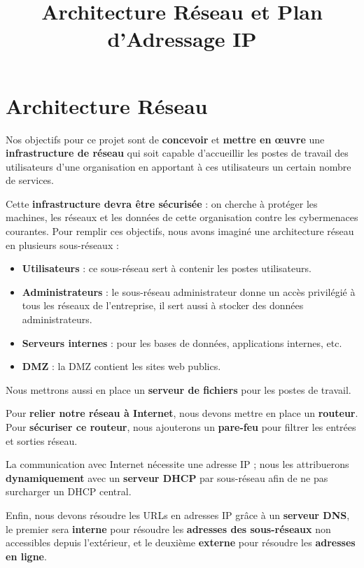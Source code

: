 \documentclass[../Livrable1.tex]{subfiles}
\begin{document}
\title{Architecture Réseau et Plan d’Adressage IP}
\author{}
\date{}
\maketitle

\section*{Architecture Réseau}

Nos objectifs pour ce projet sont de \textbf{concevoir} et \textbf{mettre en œuvre} une \textbf{infrastructure de réseau} qui soit capable d’accueillir les postes de travail des utilisateurs d’une organisation en apportant à ces utilisateurs un certain nombre de services.

Cette \textbf{infrastructure devra être sécurisée} : on cherche à protéger les machines, les réseaux et les données de cette organisation contre les cybermenaces courantes.  
Pour remplir ces objectifs, nous avons imaginé une architecture réseau en plusieurs sous-réseaux :

\begin{itemize}
    \item \textbf{Utilisateurs} : ce sous-réseau sert à contenir les postes utilisateurs.
    \item \textbf{Administrateurs} : le sous-réseau administrateur donne un accès privilégié à tous les réseaux de l’entreprise, il sert aussi à stocker des données administrateurs.
    \item \textbf{Serveurs internes} : pour les bases de données, applications internes, etc.
    \item \textbf{DMZ} : la DMZ contient les sites web publics.
\end{itemize}

Nous mettrons aussi en place un \textbf{serveur de fichiers} pour les postes de travail.

Pour \textbf{relier notre réseau à Internet}, nous devons mettre en place un \textbf{routeur}. Pour \textbf{sécu\-ri\-ser ce routeur}, nous ajouterons un \textbf{pare-feu} pour filtrer les entrées et sorties réseau.

La communication avec Internet nécessite une adresse IP ; nous les attribuerons \textbf{dyna\-mi\-quement} avec un \textbf{serveur DHCP} par sous-réseau afin de ne pas surcharger un DHCP central.

Enfin, nous devons résoudre les URLs en adresses IP grâce à un \textbf{serveur DNS}, le premier sera \textbf{interne} pour résoudre les \textbf{adresses des sous-réseaux} non accessibles depuis l’extérieur, et le deuxième \textbf{externe} pour résoudre les \textbf{adresses en ligne}.
\end{document}
